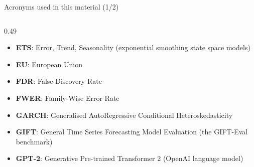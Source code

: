 \begin{frame}{Acronyms used in this material (1/2)}
\begin{columns}[T]
\begin{column}{0.49\textwidth}
\begin{itemize}
    \item \textbf{ETS}: Error, Trend, Seasonality (exponential smoothing state space models)
    \item \textbf{EU}: European Union
    \item \textbf{FDR}: False Discovery Rate
    \item \textbf{FWER}: Family-Wise Error Rate
    \item \textbf{GARCH}: Generalised AutoRegressive Conditional Heteroskedasticity
    \item \textbf{GIFT}: General Time Series Forecasting Model Evaluation (the GIFT-Eval benchmark)
    \item \textbf{GPT-2}: Generative Pre-trained Transformer 2 (OpenAI language model)
\end{itemize}
\end{column}
\end{columns}
\end{frame}
